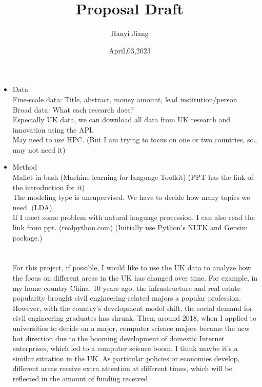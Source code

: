 \documentclass[12pt]{article}
\title{Proposal Draft}
\author{Hanyi Jiang }
\date{April,03,2023}
\begin{document}
\maketitle
\thispagestyle{fancy}

\begin{itemize}
  \item Data  ~\\
  
Fine-scale data: Title, abstract, money amount, lead institution/person \\
Broad data: What each research does? \\
Especially UK data, we can download all data from UK research and innovation using the API. \\
May need to use HPC. (But I am trying to focus on one or two countries, so… may not need it)\\
\end{itemize}
\begin{itemize}
  \item Method  ~\\
  
Mallet in bash (Machine learning for language Toolkit)  (PPT has the link of the introduction for it)\\
The modeling type is unsupervised. We have to decide how many topics we need. (LDA)\\
If I meet some problem with natural language procession, I can also read the link from ppt. (realpython.com)  (Initially use Python’s NLTK and Gensim package.) \\
~\\
~\\
For this project, if possible, I would like to use the UK data to analyze how the focus on different areas in the UK has changed over time. For example, in my home country China, 10 years ago, the infrastructure and real estate popularity brought civil engineering-related majors a popular profession. However, with the country's development model shift, the social demand for civil engineering graduates has shrunk. Then, around 2018, when I applied to universities to decide on a major, computer science majors became the new hot direction due to the booming development of domestic Internet enterprises, which led to a computer science boom. I think maybe it's a similar situation in the UK. As particular policies or economies develop, different areas receive extra attention at different times, which will be reflected in the amount of funding received.
\end{itemize}
\end{document}

